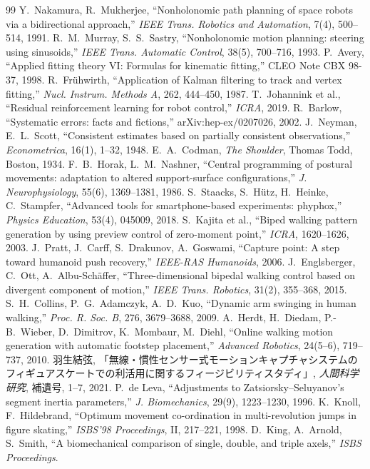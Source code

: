 \documentclass[paper=a4paper,fontsize=10pt,twocolumn,column_gap=2zw,line_length=24zw,number_of_lines=46,head_space=20mm]{jlreq}
\begin{document}
\begin{thebibliography}{99}
 Y.~Nakamura, R.~Mukherjee, ``Nonholonomic path planning of space robots via a bidirectional approach,'' \textit{IEEE Trans. Robotics and Automation}, 7(4), 500--514, 1991.
 R.~M.~Murray, S.~S.~Sastry, ``Nonholonomic motion planning: steering using sinusoids,'' \textit{IEEE Trans. Automatic Control}, 38(5), 700--716, 1993.
 P.~Avery, ``Applied fitting theory VI: Formulas for kinematic fitting,'' CLEO Note CBX 98-37, 1998.
 R.~Frühwirth, ``Application of Kalman filtering to track and vertex fitting,'' \textit{Nucl. Instrum. Methods A}, 262, 444--450, 1987.
 T.~Johannink et al., ``Residual reinforcement learning for robot control,'' \textit{ICRA}, 2019.
 R.~Barlow, ``Systematic errors: facts and fictions,'' arXiv:hep-ex/0207026, 2002.
 J.~Neyman, E.~L.~Scott, ``Consistent estimates based on partially consistent observations,'' \textit{Econometrica}, 16(1), 1--32, 1948.
 E.~A.~Codman, \textit{The Shoulder}, Thomas Todd, Boston, 1934.
 F.~B.~Horak, L.~M.~Nashner, ``Central programming of postural movements: adaptation to altered support-surface configurations,'' \textit{J. Neurophysiology}, 55(6), 1369--1381, 1986.
 S.~Staacks, S.~Hütz, H.~Heinke, C.~Stampfer, ``Advanced tools for smartphone-based experiments: phyphox,'' \textit{Physics Education}, 53(4), 045009, 2018.
 S.~Kajita et al., ``Biped walking pattern generation by using preview control of zero-moment point,'' \textit{ICRA}, 1620--1626, 2003.
 J.~Pratt, J.~Carff, S.~Drakunov, A.~Goswami, ``Capture point: A step toward humanoid push recovery,'' \textit{IEEE-RAS Humanoids}, 2006.
 J.~Englsberger, C.~Ott, A.~Albu-Sch\"affer, ``Three-dimensional bipedal walking control based on divergent component of motion,'' \textit{IEEE Trans. Robotics}, 31(2), 355--368, 2015.
 S.~H.~Collins, P.~G.~Adamczyk, A.~D.~Kuo, ``Dynamic arm swinging in human walking,'' \textit{Proc. R. Soc. B}, 276, 3679--3688, 2009.
 A.~Herdt, H.~Diedam, P.-B.~Wieber, D.~Dimitrov, K.~Mombaur, M.~Diehl, ``Online walking motion generation with automatic footstep placement,'' \textit{Advanced Robotics}, 24(5--6), 719--737, 2010.
 羽生結弦, 「無線・慣性センサー式モーションキャプチャシステムのフィギュアスケートでの利活用に関するフィージビリティスタディ」, \textit{人間科学研究}, 補遺号, 1--7, 2021.
 P.~de Leva, ``Adjustments to Zatsiorsky--Seluyanov's segment inertia parameters,'' \textit{J. Biomechanics}, 29(9), 1223--1230, 1996.
 K.~Knoll, F.~Hildebrand, ``Optimum movement co-ordination in multi-revolution jumps in figure skating,'' \textit{ISBS'98 Proceedings}, II, 217--221, 1998.
 D.~King, A.~Arnold, S.~Smith, ``A biomechanical comparison of single, double, and triple axels,'' \textit{ISBS Proceedings}.
\end{thebibliography}
\end{document}
